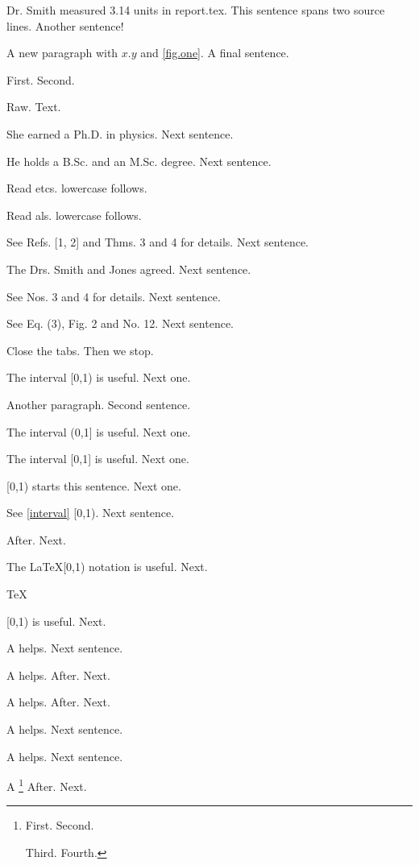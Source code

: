 
Dr. Smith measured 3.14 units in report.tex.
This sentence spans two source lines.
Another sentence!

A new paragraph with \(x. y\) and \ref{fig.one}.
A final sentence.

First.
Second.
\begin{custom}
  Raw. Text.
\end{custom}

She earned a Ph.D. in physics.
Next sentence.

He holds a B.Sc. and an M.Sc. degree.
Next sentence.

Read etcs.
lowercase follows.

Read als.
lowercase follows.

See Refs. [1, 2] and Thms. 3 and 4 for details.
Next sentence.

The Drs. Smith and Jones agreed.
Next sentence.

See Nos. 3 and 4 for details.
Next sentence.

See Eq. (3), Fig. 2 and No. 12.
Next sentence.

Close the tabs.
Then we stop.

The interval [0,1) is useful.
Next one.

Another paragraph.
Second sentence.

The interval (0,1] is useful.
Next one.

The interval [0,1] is useful.
Next one.

[0,1) starts this sentence.
Next one.

See \ref{interval} [0,1).
Next sentence.

After.
Next.

The \LaTeX [0,1) notation is useful.
Next.

\TeX

[0,1) is useful.
Next.

A \cite[see p. 2]{key} helps.
Next sentence.

A \cite[
see p. 2]{key} helps.
After.
Next.

A \cite[see p. 2]{key} helps.
After.
Next.

A \cite[see {the ] and [ symbols. here} p. 2]{key} helps.
Next sentence.

A \cite[Author][see p. 2]{key} helps.
Next sentence.

A \footnote{
  First. Second.

Third. Fourth.}
After.
Next.


